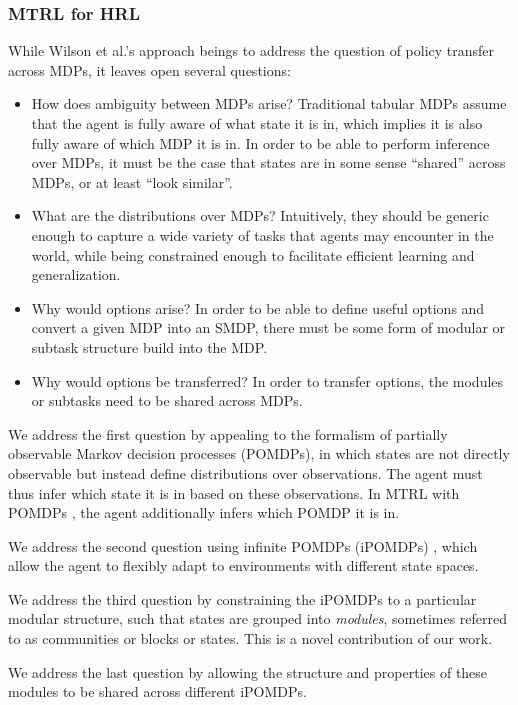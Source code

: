 \documentclass[11pt]{article}
\begin{document}
\subsubsection{MTRL for HRL}

While Wilson et al.'s approach beings to address the question of policy transfer across MDPs, it leaves open several questions:

\begin{itemize}
\item How does ambiguity between MDPs arise? Traditional tabular MDPs assume that the agent is fully aware of what state it is in, which implies it is also fully aware of which MDP it is in. In order to be able to perform inference over MDPs, it must be the case that states are in some sense ``shared'' across MDPs, or at least ``look similar''.
\item What are the distributions over MDPs? Intuitively, they should be generic enough to capture a wide variety of tasks that agents may encounter in the world, while being constrained enough to facilitate efficient learning and generalization.
\item Why would options arise? In order to be able to define useful options and convert a given MDP into an SMDP, there must be some form of modular or subtask structure build into the MDP.
\item Why would options be transferred? In order to transfer options, the modules or subtasks need to be shared across MDPs.
\end{itemize}

We address the first question by appealing to the formalism of partially observable Markov decision processes (POMDPs), in which states are not directly observable but instead define distributions over observations. The agent must thus infer which state it is in based on these observations. In MTRL with POMDPs \cite{Li2009}, the agent additionally infers which POMDP it is in.

We address the second question using infinite POMDPs (iPOMDPs) \cite{DoshiVelez2009}, which allow the agent to flexibly adapt to environments with different state spaces.

We address the third question by constraining the iPOMDPs to a particular modular structure, such that states are grouped into \textit{modules}, sometimes referred to as communities or blocks or states. This is a novel contribution of our work.

We address the last question by allowing the structure and properties of these modules to be shared across different iPOMDPs.
\end{document}
